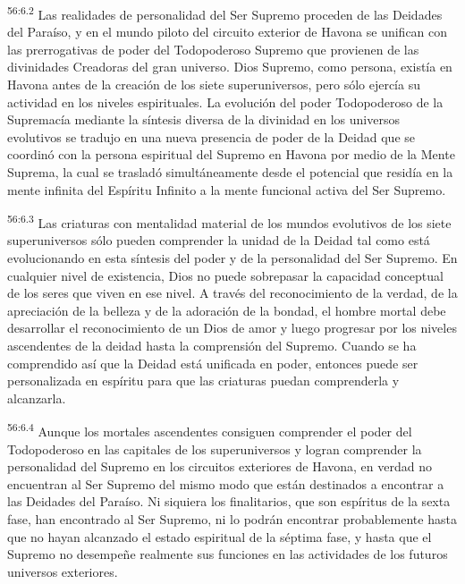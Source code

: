 \par
\textsuperscript{56:6.2} Las realidades de personalidad del Ser Supremo proceden de las Deidades del Paraíso, y en el mundo piloto del circuito exterior de Havona se unifican con las prerrogativas de poder del Todopoderoso Supremo que provienen de las divinidades Creadoras del gran universo. Dios Supremo, como persona, existía en Havona antes de la creación de los siete superuniversos, pero sólo ejercía su actividad en los niveles espirituales. La evolución del poder Todopoderoso de la Supremacía mediante la síntesis diversa de la divinidad en los universos evolutivos se tradujo en una nueva presencia de poder de la Deidad que se coordinó con la persona espiritual del Supremo en Havona por medio de la Mente Suprema, la cual se trasladó simultáneamente desde el potencial que residía en la mente infinita del Espíritu Infinito a la mente funcional activa del Ser Supremo.

\par
\textsuperscript{56:6.3} Las criaturas con mentalidad material de los mundos evolutivos de los siete superuniversos sólo pueden comprender la unidad de la Deidad tal como está evolucionando en esta síntesis del poder y de la personalidad del Ser Supremo. En cualquier nivel de existencia, Dios no puede sobrepasar la capacidad conceptual de los seres que viven en ese nivel. A través del reconocimiento de la verdad, de la apreciación de la belleza y de la adoración de la bondad, el hombre mortal debe desarrollar el reconocimiento de un Dios de amor y luego progresar por los niveles ascendentes de la deidad hasta la comprensión del Supremo. Cuando se ha comprendido así que la Deidad está unificada en poder, entonces puede ser personalizada en espíritu para que las criaturas puedan comprenderla y alcanzarla.

\par
\textsuperscript{56:6.4} Aunque los mortales ascendentes consiguen comprender el poder del Todopoderoso en las capitales de los superuniversos y logran comprender la personalidad del Supremo en los circuitos exteriores de Havona, en verdad no encuentran al Ser Supremo del mismo modo que están destinados a encontrar a las Deidades del Paraíso. Ni siquiera los finalitarios, que son espíritus de la sexta fase, han encontrado al Ser Supremo, ni lo podrán encontrar probablemente hasta que no hayan alcanzado el estado espiritual de la séptima fase, y hasta que el Supremo no desempeñe realmente sus funciones en las actividades de los futuros universos exteriores.

